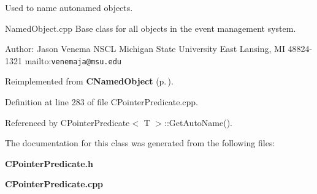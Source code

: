 Used to name autonamed objects.

Named\-Object.cpp Base class for all objects in the event management system.

Author: Jason Venema NSCL Michigan State University East Lansing, MI 48824-1321 mailto:{\tt venemaja@msu.edu} 

Reimplemented from {\bf CNamed\-Object} {\rm (p.\,\pageref{classCNamedObject_r0})}.

Definition at line 283 of file CPointer\-Predicate.cpp.

Referenced by CPointer\-Predicate$<$ T $>$::Get\-Auto\-Name().

The documentation for this class was generated from the following files:\begin{CompactItemize}
\item 
{\bf CPointer\-Predicate.h}\item 
{\bf CPointer\-Predicate.cpp}\end{CompactItemize}
